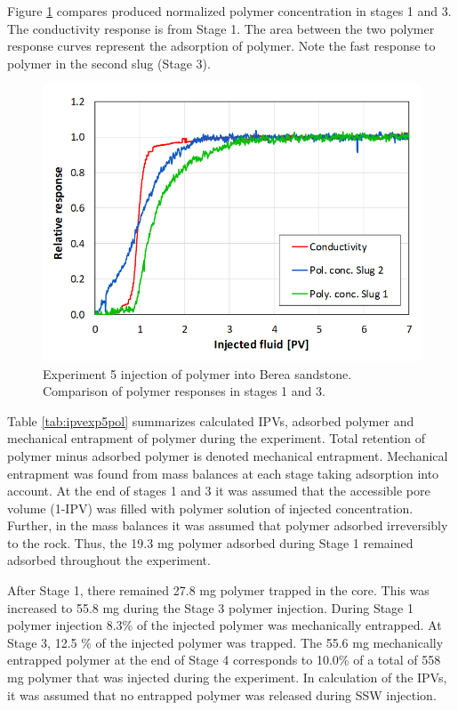 Figure \ref{cht:injexp5ber2} compares produced normalized polymer concentration in stages 1 and 3. The conductivity response is from Stage 1. The area between the two polymer response curves represent the adsorption of polymer. Note the fast response to polymer in the second slug (Stage 3).

\begin{figure}[h!]
    \centering
    \includegraphics[width=\textwidth]{img/cht/injexp5ber2.png}
    \caption{Experiment 5 injection of polymer into Berea sandstone. Comparison of polymer responses in stages 1 and 3.}
    \label{cht:injexp5ber2}
\end{figure}

Table \ref{tab:ipvexp5pol} summarizes calculated IPVs, adsorbed polymer and mechanical entrapment of polymer during the experiment. Total retention of polymer minus adsorbed polymer is denoted mechanical entrapment. Mechanical entrapment was found from mass balances at each stage taking adsorption into account. At the end of stages 1 and 3 it was assumed that the accessible pore volume (1-IPV) was filled with polymer solution of injected concentration. Further, in the mass balances it was assumed that polymer adsorbed irreversibly to the rock. Thus, the 19.3 mg polymer adsorbed during Stage 1 remained adsorbed throughout the experiment.

After Stage 1, there remained 27.8 mg polymer trapped in the core. This was increased to 55.8 mg during the Stage 3 polymer injection. During Stage 1 polymer injection 8.3\% of the injected polymer was mechanically entrapped. At Stage 3, 12.5 \% of the injected polymer was trapped. The 55.6 mg mechanically entrapped polymer at the end of Stage 4 corresponds to 10.0\% of a total of 558 mg polymer that was injected during the experiment. In calculation of the IPVs, it was assumed that no entrapped polymer was released during SSW injection.

